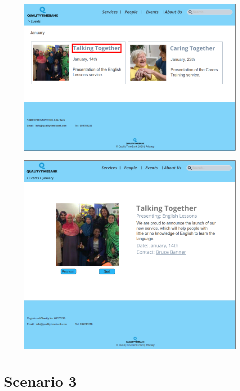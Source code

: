 \documentclass[a4paper, 11pt, parskip=half, headsepline]{scrreprt}
\begin{document}
\begin{figure}[H]
	\centering
	\includegraphics[width=1\linewidth, keepaspectratio]{scenarios/scenario-23}
	\caption{}
	\label{fig:scenario-23}
\end{figure}

\begin{figure}[H]
	\centering
	\includegraphics[width=1\linewidth, keepaspectratio]{scenarios/scenario-24}
	\caption{}
	\label{fig:scenario-24}
\end{figure}

\section{Scenario 3}
\end{document}

